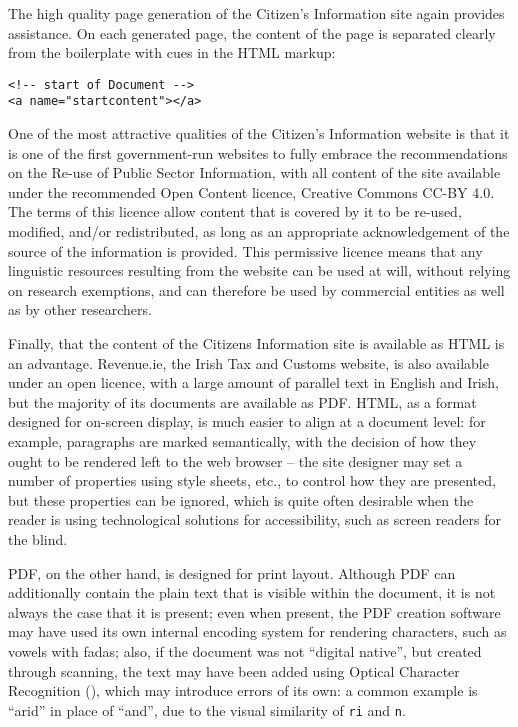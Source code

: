 The high quality page generation of the Citizen's Information site again provides assistance. On each generated
page, the content of the page is separated clearly from the boilerplate with cues in the HTML markup:

\begin{verbatim}
<!-- start of Document -->
<a name="startcontent"></a>
\end{verbatim}

One of the most attractive qualities of the Citizen's Information website is that it is one of the
first government-run websites to fully embrace the recommendations on the Re-use of Public Sector Information,
with all content of the site available under the recommended Open Content licence, Creative Commons CC-BY 4.0.
The terms of this licence allow content that is covered by it to be re-used, modified, and/or redistributed,
as long as an appropriate acknowledgement of the source of the information is provided. This permissive
licence means that any linguistic resources resulting from the website can be used at will, without relying
on research exemptions, and can therefore be used by commercial entities as well as by other researchers.

Finally, that the content of the Citizens Information site is available as HTML is an advantage. Revenue.ie,
the Irish Tax and Customs website, is also available under an open licence, with a large amount of parallel
text in English and Irish, but the majority of its documents are available as PDF. HTML, as a format designed
for on-screen display, is much easier to align at a document level: for example, paragraphs are marked
semantically, with the decision of how they ought to be rendered left to the web browser -- the site designer
may set a number of properties using style sheets, etc., to control how they are presented, but these
properties can be ignored, which is quite often desirable when the reader is using technological solutions
for accessibility, such as screen readers for the blind.

PDF, on the other hand, is designed for print layout. Although PDF can additionally contain the plain text
that is visible within the document, it is not always the case that it is present; even when present, the
PDF creation software may have used its own internal encoding system for rendering characters, such as vowels
with fadas; also, if the document was not ``digital native'', but created through scanning, the text may have
been added using Optical Character Recognition (), which may introduce errors of its own: a common
example is ``arid'' in place of ``and'', due to the visual similarity of \texttt{ri} and \texttt{n}.

